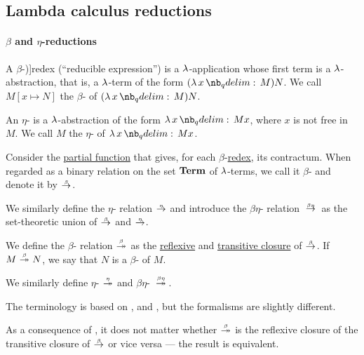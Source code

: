 \subsection{Lambda calculus reductions}\label{subsec:lambda_calculus_reductions}

\paragraph{\( \beta \) and \( \eta \)-reductions}

\begin{definition}\label{def:beta_redex}
  A \( \beta \)-\term[ru=редекс (\cite[191]{Герасимов2011})]{redex} (\enquote{reducible expression}) is a \( \mathrm{\lambda} \)-application whose first term is a \( \mathrm{\lambda} \)-abstraction, that is, a \( \mathrm{\lambda} \)-term of the form \( (\qabs x M) N \). We call \( M[x \mapsto N] \) the \( \beta \)- of \( (\qabs x M) N \).
\end{definition}

\begin{definition}\label{def:eta_redex}
  An \( \eta \)- is a \( \mathrm{\lambda} \)-abstraction of the form \( \qabs x M x \), where \( x \) is not free in \( M \). We call \( M \) the \( \eta \)- of \( \qabs x M x \).
\end{definition}

\begin{definition}\label{def:beta_eta_reduction}\mimprovised
  Consider the \hyperref[def:set_valued_map/partial]{partial function} that gives, for each \( \beta \)-\hyperref[def:beta_redex]{redex}, its contractum. When regarded as a binary relation on the set \( \op*{Term} \) of \( \mathrm{\lambda} \)-terms, we call it \( \beta \)- and denote it by \( {\bred} \).

  We similarly define the \( \eta \)- relation \( {\ered} \) and introduce the \( \beta\eta \)- relation \( {\bered} \) as the set-theoretic union of \( {\bred} \) and \( {\ered} \).

  We define the \( \beta \)- relation \( {\bred*} \) as the \hyperref[def:relation_closures/reflexive]{reflexive} and \hyperref[def:relation_closures/transitive]{transitive closure} of \( {\bred} \). If \( M \bred* N \), we say that \( N \) is a \( \beta \)- of \( M \).

  We similarly define \( \eta \)- \( {\ered*} \) and \( \beta\eta \)- \( {\bered*} \).
\end{definition}
\begin{comments}
  \item The terminology is based on \cite[ch. 3]{Barendregt1984}, \cite[1B2]{Hindley1997} and \cite[191]{Герасимов2011}, but the formalisms are slightly different.

  \item As a consequence of , it does not matter whether \( {\bred*} \) is the reflexive closure of the transitive closure of \( {\bred} \) or vice versa --- the result is equivalent.
\end{comments}

